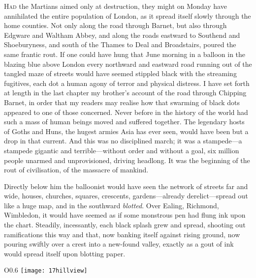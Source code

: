 

	\lettrine[lines=4]{H}{ad} the Martians aimed only at destruction, they might on Monday have annihilated the entire population of London, as it spread itself slowly through the home counties. Not only along the road through Barnet, but also through Edgware and Waltham Abbey, and along the roads eastward to Southend and Shoeburyness, and south of the Thames to Deal and Broadstairs, poured the same frantic rout. If one could have hung that June morning in a balloon in the blazing blue above London every northward and eastward road running out of the tangled maze of streets would have seemed stippled black with the streaming fugitives, each dot a human agony of terror and physical distress. I have set forth at length in the last chapter my brother's account of the road through Chipping Barnet, in order that my readers may realise how that swarming of black dots appeared to one of those concerned. Never before in the history of the world had such a mass of human beings moved and suffered together. The legendary hosts of Goths and Huns, the hugest armies Asia has ever seen, would have been but a drop in that current. And this was no disciplined march; it was a stampede—a stampede gigantic and terrible—without order and without a goal, six million people unarmed and unprovisioned, driving headlong. It was the beginning of the rout of civilisation, of the massacre of mankind.

Directly below him the balloonist would have seen the network of streets far and wide, houses, churches, squares, crescents, gardens—already derelict—spread out like a huge map, and in the southward \textit{blotted}. Over Ealing, Richmond, Wimbledon, it would have seemed as if some monstrous pen had flung ink upon the chart. Steadily, incessantly, each black splash grew and spread, shooting out ramifications this way and that, now banking itself against rising ground, now pouring swiftly over a crest into a new-found valley, exactly as a gout of ink would spread itself upon blotting paper.

\begin{wrapfigure}{O}{0.6\textwidth}
\centering
\texttt{[image: 17hillview]}
\end{wrapfigure}


